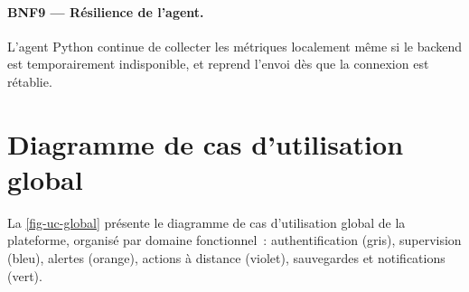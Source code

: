 \paragraph{BNF9 --- Résilience de l'agent.} L'agent Python continue de collecter les métriques localement même si le backend est temporairement indisponible, et reprend l'envoi dès que la connexion est rétablie.

\section{Diagramme de cas d'utilisation global}

La \cref{fig-uc-global} présente le diagramme de cas d'utilisation global de la plateforme, organisé par domaine fonctionnel~: authentification (gris), supervision (bleu), alertes (orange), actions à distance (violet), sauvegardes et notifications (vert).

